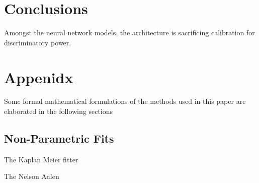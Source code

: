 \documentclass[%
 reprint,
 amsmath,amssymb,
 aps,
]{revtex4-2}
\begin{document}
\section{\label{conc}Conclusions}
Amongst the neural network models, the architecture is sacrificing calibration for discriminatory power.

\cite{*}


\appendix

\section{\label{appdx}Appenidx}

Some formal mathematical formulations of the methods used in this paper are elaborated in the following sections
\subsection{\label{non_param}Non-Parametric Fits}
The Kaplan Meier fitter

The Nelson Aalen
\end{document}
